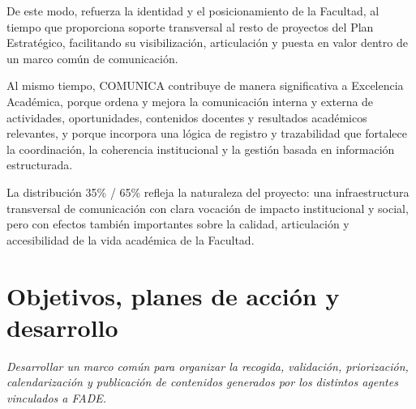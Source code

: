 \documentclass[11pt,a4paper]{scrreprt}
\begin{document}
De este modo, refuerza la identidad y el posicionamiento de la Facultad, al tiempo que proporciona soporte transversal al resto de proyectos del Plan Estratégico, facilitando su visibilización, articulación y puesta en valor dentro de un marco común de comunicación.

Al mismo tiempo, COMUNICA contribuye de manera significativa a Excelencia Académica, porque ordena y mejora la comunicación interna y externa de actividades, oportunidades, contenidos docentes y resultados académicos relevantes, y porque incorpora una lógica de registro y trazabilidad que fortalece la coordinación, la coherencia institucional y la gestión basada en información estructurada.

La distribución 35\% / 65\% refleja la naturaleza del proyecto: una infraestructura transversal de comunicación con clara vocación de impacto institucional y social, pero con efectos también importantes sobre la calidad, articulación y accesibilidad de la vida académica de la Facultad.


\section{Objetivos, planes de acción y desarrollo}

\newpage
{}
{\small\color{mutedcolor}\itshape Desarrollar un marco común para organizar la recogida, validación, priorización, calendarización y publicación de contenidos generados por los distintos agentes vinculados a FADE.}\par\vspace{6pt}
\end{document}
